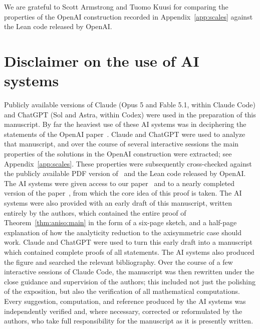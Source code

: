 \documentclass[11pt,reqno]{amsproc}
\numberwithin{equation}{section}
\theoremstyle{remark}
\begin{document}
We are grateful to Scott Armstrong and Tuomo Kuusi for comparing the properties of the OpenAI construction recorded in Appendix~\ref{app:scales} against the Lean code released by OpenAI.

\section*{Disclaimer on the use of AI systems} 
Publicly available versions of Claude (Opus 5 and Fable 5.1, within Claude Code) and ChatGPT (Sol and Astra, within Codex) were used in the preparation of this manuscript. By far the heaviest use of these AI systems was in deciphering the statements of the OpenAI paper~\cite{OpenAIManuscript}. Claude and ChatGPT were used to analyze that manuscript, and over the course of several interactive sessions the main properties of the solutions in the OpenAI construction were extracted; see Appendix~\ref{app:scales}. These properties were subsequently cross-checked against the publicly available PDF version of~\cite{OpenAIManuscript} and the Lean code released by OpenAI. The AI systems were given access to our paper~\cite{CIV26} and to a nearly completed version of the paper~\cite{CIVEulerLength}, from which the core idea of this proof is taken. The AI systems were also provided with an early draft of this manuscript, written entirely by the authors, which contained the entire proof of Theorem~\ref{thm:aniso:main} in the form of a six-page sketch, and a half-page explanation of how the analyticity reduction to the axisymmetric case should work. Claude and ChatGPT were used to turn this early draft into a manuscript which contained complete proofs of all statements. The AI systems also produced the figure and searched the relevant bibliography. Over the course of a few interactive sessions of Claude Code, the manuscript was then rewritten under the close guidance and supervision of the authors; this included not just the polishing of the exposition, but also the verification of all mathematical computations. Every suggestion, computation, and reference produced by the AI systems was independently verified and, where necessary, corrected or reformulated by the authors, who take full responsibility for the manuscript as it is presently written.
\end{document}
